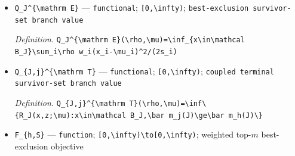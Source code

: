 \documentclass{article}
\begin{document}
\begin{itemize}
  \par\smallskip\noindent\emph{Definition.} \texttt{\textbackslash{}\allowbreak{}bar m\_\allowbreak{}i(J;\allowbreak{}x,\allowbreak{}z)=\allowbreak{}\textbackslash{}\allowbreak{}\{\textbackslash{}\allowbreak{}rho w\_\allowbreak{}i x\_\allowbreak{}i+\allowbreak{}r\_\allowbreak{}i(J;\allowbreak{}\textbackslash{}\allowbreak{}rho)z\_\allowbreak{}i\textbackslash{}\allowbreak{}\}\allowbreak{}/\allowbreak{}n\_\allowbreak{}i(J;\allowbreak{}\textbackslash{}\allowbreak{}rho)}
  \item \texttt{Q\_\allowbreak{}J\textasciicircum{}\{\textbackslash{}\allowbreak{}mathrm E\}\allowbreak{}} --- \texttt{functional}; \texttt{[0,\allowbreak{}\textbackslash{}\allowbreak{}infty)}; \texttt{best-\allowbreak{}exclusion survivor-\allowbreak{}set branch value}
  \par\smallskip\noindent\emph{Definition.} \texttt{Q\_\allowbreak{}J\textasciicircum{}\{\textbackslash{}\allowbreak{}mathrm E\}\allowbreak{}(\textbackslash{}\allowbreak{}rho,\allowbreak{}\textbackslash{}\allowbreak{}mu)=\allowbreak{}\textbackslash{}\allowbreak{}inf\_\allowbreak{}\{x\textbackslash{}\allowbreak{}in\textbackslash{}\allowbreak{}mathcal B\_\allowbreak{}J\}\allowbreak{}\textbackslash{}\allowbreak{}sum\_\allowbreak{}i\textbackslash{}\allowbreak{}rho w\_\allowbreak{}i(x\_\allowbreak{}i-\allowbreak{}\textbackslash{}\allowbreak{}mu\_\allowbreak{}i)\textasciicircum{}2/\allowbreak{}(2s\_\allowbreak{}i)}
  \item \texttt{Q\_\allowbreak{}\{J,\allowbreak{}j\}\allowbreak{}\textasciicircum{}\{\textbackslash{}\allowbreak{}mathrm T\}\allowbreak{}} --- \texttt{functional}; \texttt{[0,\allowbreak{}\textbackslash{}\allowbreak{}infty)}; \texttt{coupled terminal survivor-\allowbreak{}set branch value}
  \par\smallskip\noindent\emph{Definition.} \texttt{Q\_\allowbreak{}\{J,\allowbreak{}j\}\allowbreak{}\textasciicircum{}\{\textbackslash{}\allowbreak{}mathrm T\}\allowbreak{}(\textbackslash{}\allowbreak{}rho,\allowbreak{}\textbackslash{}\allowbreak{}mu)=\allowbreak{}\textbackslash{}\allowbreak{}inf\textbackslash{}\allowbreak{}\{R\_\allowbreak{}J(x,\allowbreak{}z;\allowbreak{}\textbackslash{}\allowbreak{}mu):\allowbreak{}x\textbackslash{}\allowbreak{}in\textbackslash{}\allowbreak{}mathcal B\_\allowbreak{}J,\allowbreak{}\textbackslash{}\allowbreak{}bar m\_\allowbreak{}j(J)\textbackslash{}\allowbreak{}ge\textbackslash{}\allowbreak{}bar m\_\allowbreak{}h(J)\textbackslash{}\allowbreak{}\}\allowbreak{}}
  \item \texttt{F\_\allowbreak{}\{h,\allowbreak{}S\}\allowbreak{}} --- \texttt{function}; \texttt{[0,\allowbreak{}\textbackslash{}\allowbreak{}infty)\textbackslash{}\allowbreak{}to[0,\allowbreak{}\textbackslash{}\allowbreak{}infty)}; weighted top-\(m\) best-exclusion objective

\end{itemize}
\end{document}
